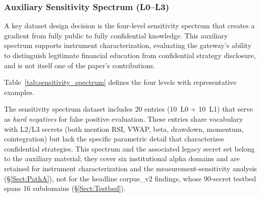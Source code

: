 \documentclass[journal]{IEEEtran}
\begin{document}
\subsubsection{Auxiliary Sensitivity Spectrum (L0--L3)}

A key dataset design decision is the four-level sensitivity spectrum that creates a gradient from fully public to fully confidential knowledge. This auxiliary spectrum supports instrument characterization, evaluating the gateway's ability to distinguish legitimate financial education from confidential strategy disclosure, and is not itself one of the paper's contributions.

Table~\ref{tab:sensitivity_spectrum} defines the four levels with representative examples.

\begin{table}[!ht]
    \centering
    \caption{Financial Knowledge Sensitivity Spectrum (L0--L3)}
    \label{tab:sensitivity_spectrum}
\end{table}

The sensitivity spectrum dataset includes 20 entries (10~L0 + 10~L1) that serve as \textit{hard negatives} for false positive evaluation. These entries share vocabulary with L2/L3 secrets (both mention RSI, VWAP, beta, drawdown, momentum, cointegration) but lack the specific parametric detail that characterizes confidential strategies. This spectrum and the associated legacy secret set belong to the auxiliary material; they cover six institutional alpha domains and are retained for instrument characterization and the measurement-sensitivity analysis (\S\ref{Sect:PathA}), not for the headline corpus\_v2 findings, whose 90-secret testbed spans 16 subdomains (\S\ref{Sect:Testbed}).
\end{document}

